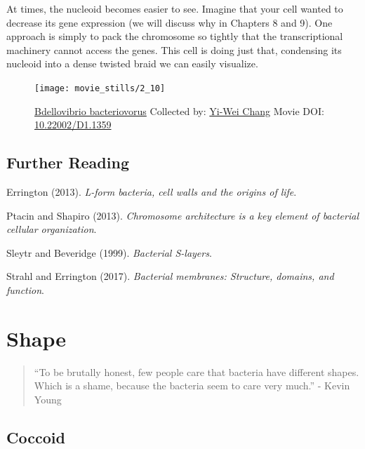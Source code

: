 \documentclass[]{tufte-book}
\begin{document}
At times, the nucleoid becomes easier to see. Imagine that your cell
wanted to decrease its gene expression (we will discuss why in Chapters
8 and 9). One approach is simply to pack the chromosome so tightly that
the transcriptional machinery cannot access the genes. This cell is
doing just that, condensing its nucleoid into a dense twisted braid we
can easily visualize.





\begin{figure}
\texttt{[image: movie\_stills/2\_10]} \caption[\protect\hyperlink{tree}{Bdellovibrio bacteriovorus}
Collected by: \protect\hyperlink{yi-wei_chang}{Yi-Wei Chang} Movie DOI:
\href{https://doi.org/10.22002/D1.1359}{10.22002/D1.1359}]{\protect\hyperlink{tree}{Bdellovibrio bacteriovorus}
Collected by: \protect\hyperlink{yi-wei_chang}{Yi-Wei Chang} Movie DOI:
\href{https://doi.org/10.22002/D1.1359}{10.22002/D1.1359}}\label{fig:2-10}
\end{figure}

\section{Further Reading}\label{further-reading}

Errington (2013). \emph{L-form bacteria, cell walls and the origins of
life}.\citep{errington2013}

Ptacin and Shapiro (2013). \emph{Chromosome architecture is a key
element of bacterial cellular organization}.\citep{ptacin2013}

Sleytr and Beveridge (1999). \emph{Bacterial
S-layers}.\citep{sleytr1999}

Strahl and Errington (2017). \emph{Bacterial membranes: Structure,
domains, and function}.\citep{strahl2017}

\chapter{Shape}\label{shape}

\begin{quote}
``To be brutally honest, few people care that bacteria have different
shapes. Which is a shame, because the bacteria seem to care very much.''
- Kevin Young \citep{young2006}
\end{quote}

\section{Coccoid}\label{coccoid}
\end{document}
